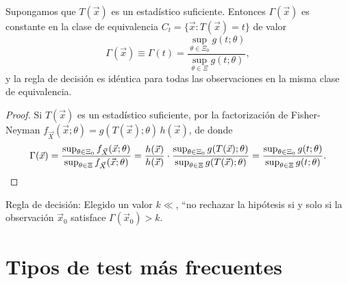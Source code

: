 {\begin{proposicion}
Supongamos que $T(\vec{x})$ es un estadístico suficiente. Entonces $\Gamma(\vec{x})$ es constante en la clase de equivalencia $C_t = \{\vec{x} : T(\vec{x}) = t\}$ de valor
\[
  \Gamma(\vec{x}) \equiv \Gamma(t) = \frac{\sup_{\theta \in \Xi_0} g(t;\theta)}{\sup_{\theta \in \Xi} g(t;\theta)},
\]
y la regla de decisión es idéntica para todas las observaciones en la misma clase de equivalencia.
\end{proposicion}
\begin{proof}
Si $T(\vec{x})$ es un estadístico suficiente, por la factorización de Fisher-Neyman $f_{\vec{X}}(\vec{x};\theta) = g(T(\vec{x});\theta)\,h(\vec{x})$, de donde
\[
  \Gamma(\vec{x}) = \frac{\sup_{\theta \in \Xi_0} f_{\vec{X}}(\vec{x};\theta)}{\sup_{\theta \in \Xi} f_{\vec{X}}(\vec{x};\theta)} = \frac{h(\vec{x})}{h(\vec{x})}\cdot\frac{\sup_{\theta \in \Xi_0} g(T(\vec{x});\theta)}{\sup_{\theta \in \Xi} g(T(\vec{x});\theta)} = \frac{\sup_{\theta \in \Xi_0} g(t;\theta)}{\sup_{\theta \in \Xi} g(t;\theta)}. \qedhere
\]
\end{proof}
Regla de decisi\'on: Elegido un valor $k\ll$, ``no rechazar la hip\'otesis si y solo si la observaci\'on $\vec{x}_0$ satisface $\Gamma(\vec{x}_0) > k$.}

\section{Tipos de test más frecuentes}


